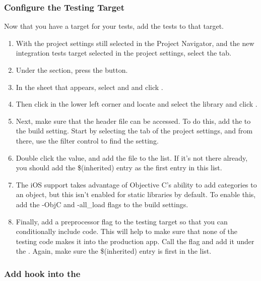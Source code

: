 \subsubsection{Configure the Testing Target}

Now that you have a target for your tests, add the tests to that target. 
\begin{enumerate}
\item  With the project settings still selected in the Project Navigator, and the new integration tests target selected in the project settings, select the  tab. 
\item Under the  section, press the \bxcaption{+} button. 
\item In the sheet that appears, select  and  and click .
\item Then click  in the lower left corner and locate and select the library  and click .
\item Next, make sure that the   header file can be accessed. To do this, add the  to the  
build setting. Start by selecting the  tab of the project settings, and from there, use the filter control to find the 
 setting. 
\item Double click the value, and add the file  to the list. If it's not there already, you should 
add the \$(inherited) entry as the first entry in this list.
\item  The iOS support takes advantage of Objective C's ability to add categories to an object, but this isn't enabled for static libraries by default. 
To enable this, add the -ObjC and -all\_load flags to the  build settings.
\item Finally, add a preprocessor flag to the testing target so that you can conditionally include code. This will help to make sure that none of the 
testing code makes it into the production app. Call the flag  and add it under the . Again, make 
sure the \$(inherited) entry is first in the list.
\end{enumerate}

\subsubsection{Add hook into the \gdaut{}}

